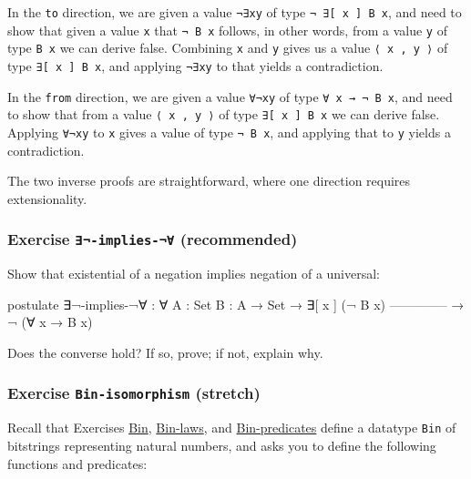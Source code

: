 In the \texttt{to} direction, we are given a value \texttt{¬∃xy} of type
\texttt{¬\ ∃{[}\ x\ {]}\ B\ x}, and need to show that given a value
\texttt{x} that \texttt{¬\ B\ x} follows, in other words, from a value
\texttt{y} of type \texttt{B\ x} we can derive false. Combining
\texttt{x} and \texttt{y} gives us a value \texttt{⟨\ x\ ,\ y\ ⟩} of
type \texttt{∃{[}\ x\ {]}\ B\ x}, and applying \texttt{¬∃xy} to that
yields a contradiction.

In the \texttt{from} direction, we are given a value \texttt{∀¬xy} of
type \texttt{∀\ x\ →\ ¬\ B\ x}, and need to show that from a value
\texttt{⟨\ x\ ,\ y\ ⟩} of type \texttt{∃{[}\ x\ {]}\ B\ x} we can derive
false. Applying \texttt{∀¬xy} to \texttt{x} gives a value of type
\texttt{¬\ B\ x}, and applying that to \texttt{y} yields a
contradiction.

The two inverse proofs are straightforward, where one direction requires
extensionality.

\hypertarget{exercise--implies--recommended}{%
\subsubsection{\texorpdfstring{Exercise \texttt{∃¬-implies-¬∀}
(recommended)}{Exercise ∃¬-implies-¬∀ (recommended)}}\label{exercise--implies--recommended}}

Show that existential of a negation implies negation of a universal:

\begin{fence}
\begin{code}
postulate
  ∃¬-implies-¬∀ : ∀ {A : Set} {B : A → Set}
    → ∃[ x ] (¬ B x)
      --------------
    → ¬ (∀ x → B x)
\end{code}
\end{fence}

Does the converse hold? If so, prove; if not, explain why.

\hypertarget{Quantifiers-Bin-isomorphism}{%
\subsubsection{\texorpdfstring{Exercise \texttt{Bin-isomorphism}
(stretch)}{Exercise Bin-isomorphism (stretch)}}\label{Quantifiers-Bin-isomorphism}}

Recall that Exercises \protect\hyperlink{Naturals-Bin}{Bin},
\protect\hyperlink{Induction-Bin-laws}{Bin-laws}, and
\protect\hyperlink{Relations-Bin-predicates}{Bin-predicates} define a
datatype \texttt{Bin} of bitstrings representing natural numbers, and
asks you to define the following functions and predicates:


